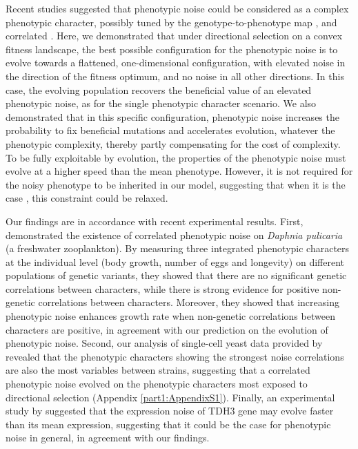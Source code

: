 Recent studies suggested that phenotypic noise could be considered as a complex phenotypic character, possibly tuned by the genotype-to-phenotype map \citep{yvert-et-al-2013,boukhibar-and-barkoulas-2016}, and correlated \citep{cressler-et-al-2017}. Here, we demonstrated that under directional selection on a convex fitness landscape, the best possible configuration for the phenotypic noise is to evolve towards a flattened, one-dimensional configuration, with elevated noise in the direction of the fitness optimum, and no noise in all other directions. In this case, the evolving population recovers the beneficial value of an elevated phenotypic noise, as for the single phenotypic character scenario. We also demonstrated that in this specific configuration, phenotypic noise increases the probability to fix beneficial mutations and accelerates evolution, whatever the phenotypic complexity, thereby partly compensating for the cost of complexity. To be fully exploitable by evolution, the properties of the phenotypic noise must evolve at a higher speed than the mean phenotype. However, it is not required for the noisy phenotype to be inherited in our model, suggesting that when it is the case \citep{charlebois-et-al-2011}, this constraint could be relaxed.

Our findings are in accordance with recent experimental results. First, \cite{cressler-et-al-2017} demonstrated the existence of correlated phenotypic noise on \textit{Daphnia pulicaria} (a freshwater zooplankton). By measuring three integrated phenotypic characters at the individual level (body growth, number of eggs and longevity) on different populations of genetic variants, they showed that there are no significant genetic correlations between characters, while there is strong evidence for positive non-genetic correlations between characters. Moreover, they showed that increasing phenotypic noise enhances growth rate when non-genetic correlations between characters are positive, in agreement with our prediction on the evolution of phenotypic noise. Second, our analysis of single-cell yeast data provided by \cite{yvert-et-al-2013} revealed that the phenotypic characters showing the strongest noise correlations are also the most variables between strains, suggesting that a correlated phenotypic noise evolved on the phenotypic characters most exposed to directional selection (Appendix \ref{part1:AppendixS1}). Finally, an experimental study by \cite{metzger-et-al-2015} suggested that the expression noise of TDH3 gene may evolve faster than its mean expression, suggesting that it could be the case for phenotypic noise in general, in agreement with our findings.

